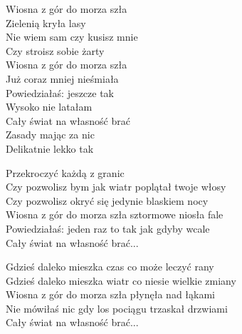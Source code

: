 \begin{text}
    Wiosna z gór do morza szła\\
    Zielenią kryła lasy\\
    Nie wiem sam czy kusisz mnie\\
    Czy stroisz sobie żarty\\
    Wiosna z gór do morza szła\\
    Już coraz mniej nieśmiała\\
    Powiedziałaś: jeszcze tak\\
    Wysoko nie latałam\\
    Cały świat na własność brać\\
    Zasady mając za nic\\
    Delikatnie lekko tak

    Przekroczyć każdą z granic\\
    Czy pozwolisz bym jak wiatr poplątał twoje włosy\\
    Czy pozwolisz okryć się jedynie blaskiem nocy\\
    Wiosna z gór do morza szła sztormowe niosła fale\\
    Powiedziałaś: jeden raz to tak jak gdyby wcale\\
    Cały świat na własność brać...

    Gdzieś daleko mieszka czas co może leczyć rany\\
    Gdzieś daleko mieszka wiatr co niesie wielkie zmiany\\
    Wiosna z gór do morza szła płynęła nad łąkami\\
    Nie mówiłaś nic gdy los pociągu trzaskał drzwiami\\
    Cały świat na własność brać...
\end{text}
\begin{chord}

\end{chord}